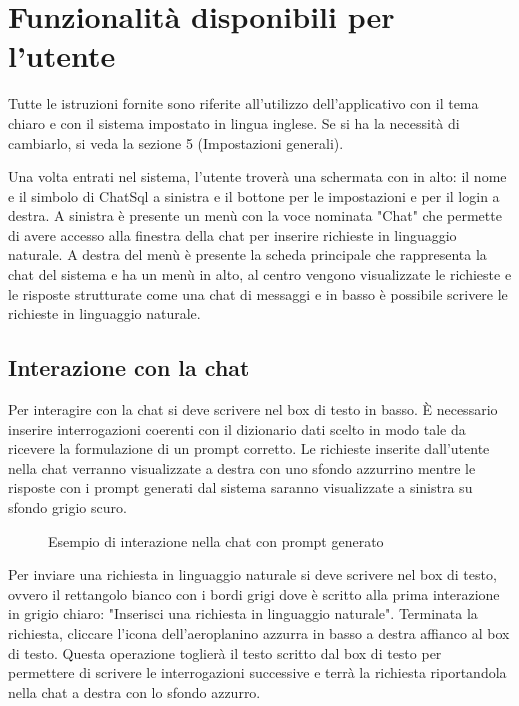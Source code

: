 \section{Funzionalità disponibili per l'utente}
\label{sec:sezUtente}

Tutte le istruzioni fornite sono riferite all'utilizzo dell'applicativo con il tema chiaro e con il sistema impostato in lingua inglese. Se si ha la necessità di cambiarlo, si veda la sezione 5 (Impostazioni generali).

Una volta entrati nel sistema, l'utente troverà una schermata con in alto: il nome e il simbolo di ChatSql a sinistra e il bottone per le impostazioni e per il login a destra. A sinistra è presente un menù con la voce nominata "Chat" che permette di avere accesso alla finestra della chat per inserire richieste in linguaggio naturale. A destra del menù è presente la scheda principale che rappresenta la chat del sistema e ha un menù in alto, al centro vengono visualizzate le richieste e le risposte strutturate come una chat di messaggi e in basso è possibile scrivere le richieste in linguaggio naturale.

\subsection{Interazione con la chat}

Per interagire con la chat si deve scrivere nel box di testo in basso. È necessario inserire interrogazioni coerenti con il dizionario dati scelto in modo tale da ricevere la formulazione di un prompt corretto. Le richieste inserite dall'utente nella chat verranno visualizzate a destra con uno sfondo azzurrino mentre le risposte con i prompt generati dal sistema saranno visualizzate a sinistra su sfondo grigio scuro.

\begin{figure}[H]
  \centering
  \caption{Esempio di interazione nella chat con prompt generato}
\end{figure}

Per inviare una richiesta in linguaggio naturale si deve scrivere nel box di testo, ovvero il rettangolo bianco con i bordi grigi dove è scritto alla prima interazione in grigio chiaro: "Inserisci una richiesta in linguaggio naturale". Terminata la richiesta, cliccare l'icona dell'aeroplanino azzurra in basso a destra affianco al box di testo. Questa operazione toglierà il testo scritto dal box di testo per permettere di scrivere le interrogazioni successive e terrà la richiesta riportandola nella chat a destra con lo sfondo azzurro.

